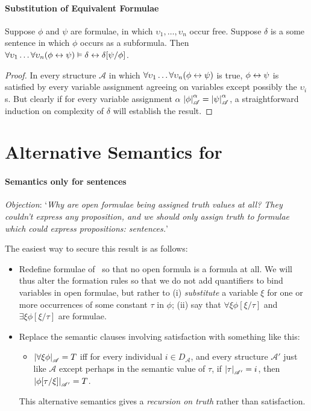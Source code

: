 \paragraph{Substitution of Equivalent Formulae}

\begin{theorem}
	Suppose $\phi$ and $\psi$ are formulae, in which $\upsilon_{1},\ldots,\upsilon_{n}$ occur free. Suppose $\delta$ is a some sentence in which $\phi$ occurs as a subformula. Then $\forall\upsilon_{1}\ldots\forall\upsilon_{n}(\phi\leftrightarrow\psi)\vDash \delta \leftrightarrow \delta[\psi/\phi]$. \begin{proof}
In every structure $\mathscr{A}$ in which $\forall\upsilon_{1}\ldots\forall\upsilon_{n}(\phi\leftrightarrow\psi)$ is true, $\phi\leftrightarrow\psi$ is satisfied by every variable assignment agreeing on variables except possibly the $\upsilon_{i}$s.  But clearly if for every variable assignment $\alpha$ $\left|\phi\right|^{\alpha}_{\mathscr{A}}=\left|\psi\right|^{\alpha}_{\mathscr{A}}$, a straightforward induction on complexity of $\delta$ will establish the result.
	\end{proof}
\end{theorem}




\section{Alternative Semantics for \ltwo}
\paragraph{Semantics only for sentences}

\emph{Objection}: `\emph{Why are open formulae being assigned truth values at all? They couldn't express any proposition, and we should only assign truth to formulae which could express propositions: sentences.}'

The easiest way to secure this result is as follows: \begin{itemize}
	\item  Redefine formulae of \ltwo\ so that no open formula is a formula at all. We will thus alter the formation rules so that we do not add quantifiers to bind variables in open formulae, but rather to (i) \emph{substitute} a variable $\xi$ for one
or more occurrences of some constant $\tau$ in $\phi$; (ii) say that $\forall\xi\phi[\xi/\tau]$ and $\exists\xi\phi[\xi/\tau]$ are formulae.
\item Replace the semantic clauses involving satisfaction with something like this:
\begin{itemize}\item $\left|\forall\xi \phi\right|_{\mathscr{A}} = T$  iff  for every
	individual $i \in D_{\mathscr{A}}$, and every structure $\mathscr{A}'$ just like $\mathscr{A}$ except perhaps in the semantic value of $\tau$,
	if $\left|\tau\right|_{\mathscr{A'}}=i$, then $\left|\phi[\tau/\xi]\right|_{\mathscr{A'}}=T$.
\end{itemize}
This alternative semantics gives a \emph{recursion on truth} \label{fiverectr} rather than satisfaction.
\end{itemize}

